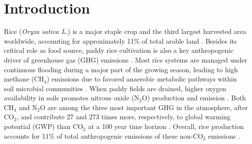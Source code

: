



\section{Introduction}
\label{sec:intro2}


Rice (\textit{Oryza sativa L.}) is a major staple crop and the third largest harvested area worldwide, accounting for approximately 11\% of total arable land \citep{Faostat2022}. Besides its critical role as food source, paddy rice cultivation is also a key anthropogenic driver of greenhouse gas (GHG) emissions \citep{bouman2007rice, nabuurs2022agriculture}. Most rice systems are managed under continuous flooding during a major part of the growing season, leading to high methane (CH$_{4}$) emissions due to favored anaerobic metabolic pathways within soil microbial communities \citep{conrad2007microbial, perry2024}. When paddy fields are drained, higher oxygen availability in soils promotes nitrous oxide (N$_{2}$O) production and emission \citep{cai1997methane}. Both CH$_{4}$ and N$_{2}$O are among the three most important GHG in the atmosphere, after CO$_{2}$, and contribute 27 and 273 times more, respectively, to global warming potential (GWP) than CO$_{2}$ at a 100 year time horizon \citep{IPCC2021}. Overall, rice production accounts for 11\% of total anthropogenic emissions of these non-CO$_{2}$ emissions \citep{Smith2007}.\\ 


